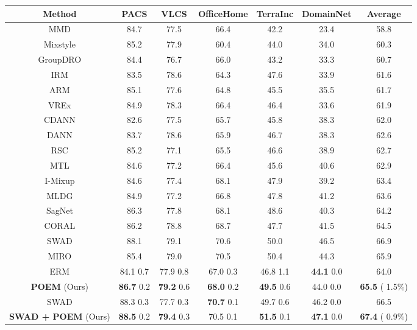 \documentclass[letterpaper]{article} \usepackage{aaai23}  \usepackage{times}  \usepackage{helvet}  \usepackage{courier}  \usepackage[hyphens]{url}  \usepackage{graphicx} \urlstyle{rm} \def\UrlFont{\rm}  \usepackage{natbib}  \usepackage{caption} \frenchspacing  \setlength{\pdfpagewidth}{8.5in}  \setlength{\pdfpageheight}{11in}  \usepackage[labelsep=period]{caption}
\begin{document}
\begin{table*}[!ht]
\centering
	\begin{tabular}{cccccc|c}
		\toprule
		\textbf{Method} & PACS & VLCS & OfficeHome & TerraInc & DomainNet & Average\\
		\midrule
		MMD \cite{MMD_DG} & 84.7 & 77.5 & 66.4 & 42.2 & 23.4 & 58.8\\
		Mixstyle \cite{Mixstyle} & 85.2 & 77.9 & 60.4 & 44.0 & 34.0 & 60.3\\
GroupDRO \cite{GroupDRO} & 84.4 & 76.7 & 66.0 & 43.2 & 33.3 & 60.7\\
		IRM \cite{IRM} & 83.5 & 78.6 & 64.3 & 47.6 & 33.9 & 61.6\\
		ARM \cite{ARM} & 85.1 & 77.6 & 64.8 & 45.5 & 35.5 & 61.7\\
		VREx \cite{VREx} & 84.9 & 78.3 & 66.4 & 46.4 & 33.6 & 61.9\\
		CDANN \cite{CDANN} & 82.6 & 77.5 & 65.7 & 45.8 & 38.3 & 62.0\\
		DANN \cite{DANN} & 83.7 & 78.6 & 65.9 & 46.7 & 38.3 & 62.6\\
		RSC \cite{RSC} & 85.2 & 77.1 & 65.5 & 46.6 & 38.9 & 62.7\\
		MTL \cite{MTL} & 84.6 & 77.2 & 66.4 & 45.6 & 40.6 & 62.9\\
		I-Mixup \cite{imixup} & 84.6 & 77.4 & 68.1 & 47.9 & 39.2 & 63.4\\
		MLDG \cite{MLDG} & 84.9 & 77.2 & 66.8 & 47.8 & 41.2 & 63.6\\
		SagNet \cite{segnet} & 86.3 & 77.8 & 68.1 & 48.6 & 40.3 & 64.2\\
		CORAL \cite{CORAL} & 86.2 & 78.8 & 68.7 & 47.7 & 41.5 & 64.5\\
		SWAD \cite{SWAD} & 88.1 & 79.1 & 70.6 & 50.0 & 46.5 & 66.9\\
		MIRO \cite{MIRO} & 85.4 & 79.0 & 70.5 & 50.4 & 44.3 & 65.9\\
ERM \cite{ERM} & 84.1  0.7& 77.9  0.8 & 67.0  0.3 & 46.8  1.1 & \textbf{44.1}  0.0 & 64.0\\
\textbf{POEM} (Ours) & \textbf{86.7}  0.2 & \textbf{79.2}  0.6 & \textbf{68.0}  0.2 & \textbf{49.5}  0.6 & 44.0  0.0 & \textbf{65.5} ( 1.5\%)\\
\bottomrule
SWAD \cite{SWAD} & 88.3  0.3 & 77.7  0.3 & \textbf{70.7}  0.1 & 49.7  0.6 & 46.2  0.0 & 66.5\\
		\textbf{SWAD + POEM} (Ours) & \textbf{88.5}  0.2 & \textbf{79.4}  0.3 & 70.5  0.1 & \textbf{51.5}  0.1 & \textbf{47.1}  0.0 & \textbf{67.4} ( 0.9\%)\\

\end{tabular}
\end{table*}
\end{document}
